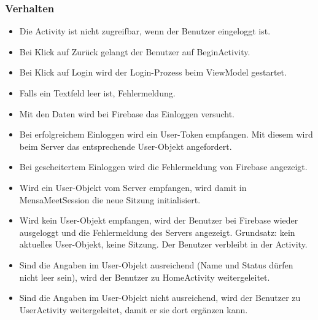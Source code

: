 \documentclass[a4paper]{scrreprt}
\begin{document}
\subsubsection{Verhalten}
\begin{itemize}
\item Die Activity ist nicht zugreifbar, wenn der Benutzer eingeloggt ist.
\item Bei Klick auf Zurück gelangt der Benutzer auf BeginActivity.
\item Bei Klick auf Login wird der Login-Prozess beim ViewModel gestartet.
\item Falls ein Textfeld leer ist, Fehlermeldung.
\item Mit den Daten wird bei Firebase das Einloggen versucht. 
\item Bei erfolgreichem Einloggen wird ein User-Token empfangen. Mit diesem wird beim Server das entsprechende User-Objekt angefordert.
\item Bei gescheitertem Einloggen wird die Fehlermeldung von Firebase angezeigt.
\item Wird ein User-Objekt vom Server empfangen, wird damit in MensaMeetSession die neue Sitzung initialisiert. 
\item Wird kein User-Objekt empfangen, wird der Benutzer bei Firebase wieder ausgeloggt und die Fehlermeldung des Servers angezeigt. Grundsatz: kein aktuelles User-Objekt, keine Sitzung. Der Benutzer verbleibt in der Activity.
\item Sind die Angaben im User-Objekt ausreichend (Name und Status dürfen nicht leer sein), wird der Benutzer zu HomeActivity weitergeleitet.
\item Sind die Angaben im User-Objekt nicht ausreichend, wird der Benutzer zu UserActivity weitergeleitet, damit er sie dort ergänzen kann.

\end{itemize}
\end{document}
